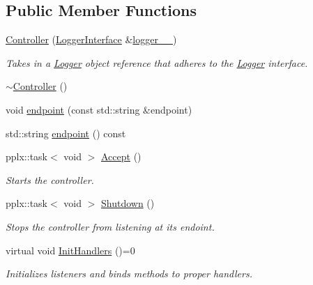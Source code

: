 \subsection*{Public Member Functions}
\begin{DoxyCompactItemize}
\item 
\mbox{\hyperlink{classcadg__rest_1_1_controller_a0232077dc5eee421cacfb9fb8b08325f}{Controller}} (\mbox{\hyperlink{classcadg__rest_1_1_logger_interface}{Logger\+Interface}} \&\mbox{\hyperlink{classcadg__rest_1_1_controller_a5eebad0222becb1157f8dd7b9e978c37}{logger\+\_\+\+\_\+}})
\begin{DoxyCompactList}\small\item\em Takes in a \mbox{\hyperlink{classcadg__rest_1_1_logger}{Logger}} object reference that adheres to the \mbox{\hyperlink{classcadg__rest_1_1_logger}{Logger}} interface. \end{DoxyCompactList}\item 
\mbox{\hyperlink{classcadg__rest_1_1_controller_ab8dacc82d5200c0acce5163a0cb7eda7}{$\sim$\+Controller}} ()
\item 
void \mbox{\hyperlink{classcadg__rest_1_1_controller_ac467633f4d51e3187bd90380a67cb0d9}{endpoint}} (const std\+::string \&endpoint)
\item 
std\+::string \mbox{\hyperlink{classcadg__rest_1_1_controller_addeea914faab4557cc7caa493fce1d2d}{endpoint}} () const
\item 
pplx\+::task$<$ void $>$ \mbox{\hyperlink{classcadg__rest_1_1_controller_a00ddfc462ff7357cecc6a209f8f9d527}{Accept}} ()
\begin{DoxyCompactList}\small\item\em Starts the controller. \end{DoxyCompactList}\item 
pplx\+::task$<$ void $>$ \mbox{\hyperlink{classcadg__rest_1_1_controller_a0a3930fbecd66d40b2455557c1c46e47}{Shutdown}} ()
\begin{DoxyCompactList}\small\item\em Stops the controller from listening at it\textquotesingle{}s endoint. \end{DoxyCompactList}\item 
virtual void \mbox{\hyperlink{classcadg__rest_1_1_controller_a47b2c049207e02f407a55a64e2a2ce80}{Init\+Handlers}} ()=0
\begin{DoxyCompactList}\small\item\em Initializes listeners and binds methods to proper handlers. \end{DoxyCompactList}\item 

\end{DoxyCompactItemize}
